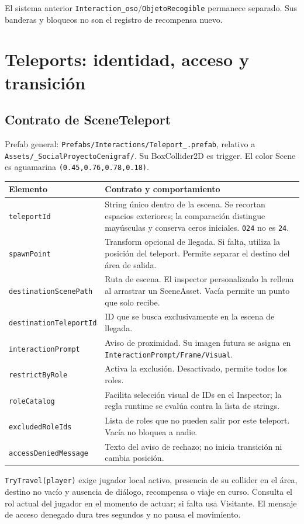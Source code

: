 \documentclass[11pt,letterpaper,oneside]{article}
\makeatletter
\newcommand{\code}[1]{\nolinkurl{#1}}
\newenvironment{spec}{\begingroup\small\begin{longtable}{@{}>{\raggedright\arraybackslash}p{0.32\textwidth}>{\raggedright\arraybackslash}p{0.64\textwidth}@{}}\toprule\textbf{Elemento} & \textbf{Contrato y comportamiento} \\ \midrule\endhead}{\bottomrule\end{longtable}\endgroup}
\makeatother
\begin{document}
El sistema anterior \code{Interaction_oso}/\code{ObjetoRecogible} permanece separado. Sus banderas y bloqueos no son el registro de recompensa nuevo.

\section{Teleports: identidad, acceso y transición}
\subsection{Contrato de SceneTeleport}
Prefab general: \code{Prefabs/Interactions/Teleport_.prefab}, relativo a \code{Assets/_SocialProyectoCenigraf/}. Su BoxCollider2D es trigger. El color Scene es aguamarina \code{(0.45,0.76,0.78,0.18)}.
\begin{spec}
\code{teleportId} & String único dentro de la escena. Se recortan espacios exteriores; la comparación distingue mayúsculas y conserva ceros iniciales. \code{024} no es \code{24}. \\
\code{spawnPoint} & Transform opcional de llegada. Si falta, utiliza la posición del teleport. Permite separar el destino del área de salida. \\
\code{destinationScenePath} & Ruta de escena. El inspector personalizado la rellena al arrastrar un SceneAsset. Vacía permite un punto que solo recibe. \\
\code{destinationTeleportId} & ID que se busca exclusivamente en la escena de llegada. \\
\code{interactionPrompt} & Aviso de proximidad. Su imagen futura se asigna en \code{InteractionPrompt/Frame/Visual}. \\
\code{restrictByRole} & Activa la exclusión. Desactivado, permite todos los roles. \\
\code{roleCatalog} & Facilita selección visual de IDs en el Inspector; la regla runtime se evalúa contra la lista de strings. \\
\code{excludedRoleIds} & Lista de roles que no pueden salir por este teleport. Vacía no bloquea a nadie. \\
\code{accessDeniedMessage} & Texto del aviso de rechazo; no inicia transición ni cambia posición. \\
\end{spec}
\code{TryTravel(player)} exige jugador local activo, presencia de su collider en el área, destino no vacío y ausencia de diálogo, recompensa o viaje en curso. Consulta el rol actual del jugador en el momento de actuar; si falta usa Visitante. El mensaje de acceso denegado dura tres segundos y no pausa el movimiento.
\end{document}
